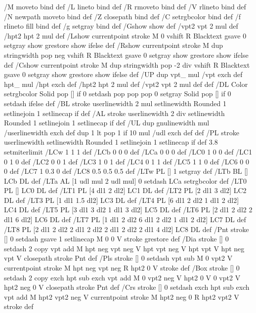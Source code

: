 %
%
%
/M {moveto} bind def
/L {lineto} bind def
/R {rmoveto} bind def
/V {rlineto} bind def
/N {newpath moveto} bind def
/Z {closepath} bind def
/C {setrgbcolor} bind def
/f {rlineto fill} bind def
/g {setgray} bind def
/Gshow {show} def   %
/vpt2 vpt 2 mul def
/hpt2 hpt 2 mul def
/Lshow {currentpoint stroke M 0 vshift R 
	Blacktext {gsave 0 setgray show grestore} {show} ifelse} def
/Rshow {currentpoint stroke M dup stringwidth pop neg vshift R
	Blacktext {gsave 0 setgray show grestore} {show} ifelse} def
/Cshow {currentpoint stroke M dup stringwidth pop -2 div vshift R 
	Blacktext {gsave 0 setgray show grestore} {show} ifelse} def
/UP {dup vpt_ mul /vpt exch def hpt_ mul /hpt exch def
  /hpt2 hpt 2 mul def /vpt2 vpt 2 mul def} def
/DL {Color {setrgbcolor Solid {pop []} if 0 setdash}
 {pop pop pop 0 setgray Solid {pop []} if 0 setdash} ifelse} def
/BL {stroke userlinewidth 2 mul setlinewidth
	Rounded {1 setlinejoin 1 setlinecap} if} def
/AL {stroke userlinewidth 2 div setlinewidth
	Rounded {1 setlinejoin 1 setlinecap} if} def
/UL {dup gnulinewidth mul /userlinewidth exch def
	dup 1 lt {pop 1} if 10 mul /udl exch def} def
/PL {stroke userlinewidth setlinewidth
	Rounded {1 setlinejoin 1 setlinecap} if} def
3.8 setmiterlimit
/LCw {1 1 1} def
/LCb {0 0 0} def
/LCa {0 0 0} def
/LC0 {1 0 0} def
/LC1 {0 1 0} def
/LC2 {0 0 1} def
/LC3 {1 0 1} def
/LC4 {0 1 1} def
/LC5 {1 1 0} def
/LC6 {0 0 0} def
/LC7 {1 0.3 0} def
/LC8 {0.5 0.5 0.5} def
/LTw {PL [] 1 setgray} def
/LTb {BL [] LCb DL} def
/LTa {AL [1 udl mul 2 udl mul] 0 setdash LCa setrgbcolor} def
/LT0 {PL [] LC0 DL} def
/LT1 {PL [4 dl1 2 dl2] LC1 DL} def
/LT2 {PL [2 dl1 3 dl2] LC2 DL} def
/LT3 {PL [1 dl1 1.5 dl2] LC3 DL} def
/LT4 {PL [6 dl1 2 dl2 1 dl1 2 dl2] LC4 DL} def
/LT5 {PL [3 dl1 3 dl2 1 dl1 3 dl2] LC5 DL} def
/LT6 {PL [2 dl1 2 dl2 2 dl1 6 dl2] LC6 DL} def
/LT7 {PL [1 dl1 2 dl2 6 dl1 2 dl2 1 dl1 2 dl2] LC7 DL} def
/LT8 {PL [2 dl1 2 dl2 2 dl1 2 dl2 2 dl1 2 dl2 2 dl1 4 dl2] LC8 DL} def
/Pnt {stroke [] 0 setdash gsave 1 setlinecap M 0 0 V stroke grestore} def
/Dia {stroke [] 0 setdash 2 copy vpt add M
  hpt neg vpt neg V hpt vpt neg V
  hpt vpt V hpt neg vpt V closepath stroke
  Pnt} def
/Pls {stroke [] 0 setdash vpt sub M 0 vpt2 V
  currentpoint stroke M
  hpt neg vpt neg R hpt2 0 V stroke
 } def
/Box {stroke [] 0 setdash 2 copy exch hpt sub exch vpt add M
  0 vpt2 neg V hpt2 0 V 0 vpt2 V
  hpt2 neg 0 V closepath stroke
  Pnt} def
/Crs {stroke [] 0 setdash exch hpt sub exch vpt add M
  hpt2 vpt2 neg V currentpoint stroke M
  hpt2 neg 0 R hpt2 vpt2 V stroke} def

